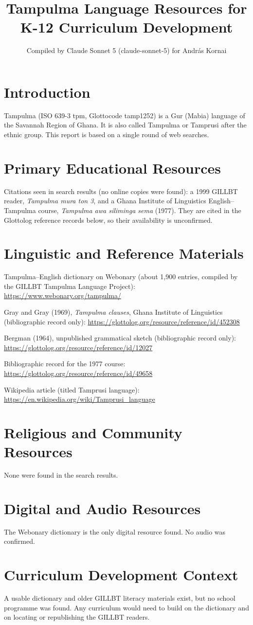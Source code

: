 \documentclass[12pt]{article}
\title{Tampulma Language Resources for K-12 Curriculum Development}
\author{Compiled by Claude Sonnet 5 (claude-sonnet-5) for Andr\'as Kornai}
\date{}
\begin{document}
\maketitle
\section{Introduction}
Tampulma (ISO 639-3 tpm, Glottocode tamp1252) is a Gur (Mabia) language of the Savannah Region of Ghana. It is also called Tampulma or Tamprusi after the ethnic group. This report is based on a single round of web searches.
\section{Primary Educational Resources}
Citations seen in search results (no online copies were found): a 1999 GILLBT reader, \emph{Tampulma mura ton 3}, and a Ghana Institute of Linguistics English--Tampulma course, \emph{Tampulma awa siliminga sema} (1977). They are cited in the Glottolog reference records below, so their availability is unconfirmed.
\section{Linguistic and Reference Materials}
Tampulma--English dictionary on Webonary (about 1,900 entries, compiled by the GILLBT Tampulma Language Project): \url{https://www.webonary.org/tampulma/}

Gray and Gray (1969), \emph{Tampulma clauses}, Ghana Institute of Linguistics (bibliographic record only): \url{https://glottolog.org/resource/reference/id/452308}

Bergman (1964), unpublished grammatical sketch (bibliographic record only): \url{https://glottolog.org/resource/reference/id/12027}

Bibliographic record for the 1977 course: \url{https://glottolog.org/resource/reference/id/49658}

Wikipedia article (titled Tamprusi language): \url{https://en.wikipedia.org/wiki/Tamprusi_language}
\section{Religious and Community Resources}
None were found in the search results.
\section{Digital and Audio Resources}
The Webonary dictionary is the only digital resource found. No audio was confirmed.
\section{Curriculum Development Context}
A usable dictionary and older GILLBT literacy materials exist, but no school programme was found. Any curriculum would need to build on the dictionary and on locating or republishing the GILLBT readers.
\end{document}
